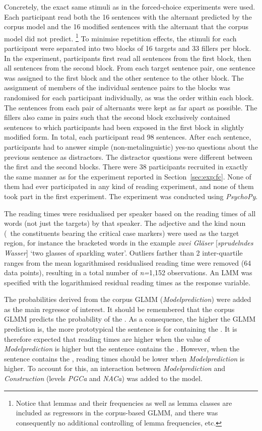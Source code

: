 Concretely, the exact same stimuli as in the forced-choice experiments were used.
Each participant read both the 16 sentences with the alternant predicted by the corpus model and the 16 modified sentences with the alternant that the corpus model did not predict.%
\footnote{Notice that lemmas and their frequencies as well as lemma classes are included as regressors in the corpus-based GLMM, and there was consequently no additional controlling of lemma frequencies, etc.}
To minimise repetition effects, the stimuli for each participant were separated into two blocks of 16 targets and 33 fillers per block.
In the experiment, participants first read all sentences from the first block, then all sentences from the second block.
From each target sentence pair, one sentence was assigned to the first block and the other sentence to the other block.
The assignment of members of the individual sentence pairs to the blocks was randomised for each participant individually, as was the order within each block.
The sentences from each pair of alternants were kept as far apart as possible.
The fillers also came in pairs such that the second block exclusively contained sentences to which participants had been exposed in the first block in slightly modified form.
In total, each participant read 98 sentences.
After each sentence, participants had to answer simple (non-metalinguistic) yes-no questions about the previous sentence as distractors.
The distractor questions were different between the first and the second blocks.
There were 38 participants recruited in exactly the same manner as for the experiment reported in Section~\ref{sec:exp:fc}.
None of them had ever participated in any kind of reading experiment, and none of them took part in the first experiment.
The experiment was conducted using \textit{PsychoPy}.

The reading times were residualised per speaker based on the reading times of all words (not just the targets) by that speaker.
The adjective and the kind noun (\ie\ the constituents bearing the critical case markers) were used as the target region, for instance the bracketed words in the example \textit{zwei Gläser} [\textit{spru\-deln\-des Wasser}] `two glasses of sparkling water'.
Outliers farther than 2 inter-quartile ranges from the mean logarithmised residualised reading time were removed (64 data points), resulting in a total number of \textit{n=}1,152 observations.
An LMM was specified with the logarithmised residual reading times as the response variable.

The probabilities derived from the corpus GLMM (\textit{Modelprediction}) were added as the main regressor of interest.
It should be remembered that the corpus GLMM predicts the probability of the \PGCa.
As a consequence, the higher the GLMM prediction is, the more prototypical the sentence is for containing the \PGCa.
It is therefore expected that reading times are higher when the value of \textit{Modelprediction} is higher but the sentence contains the \NACa.
However, when the sentence contains the \PGCa, reading times should be lower when \textit{Modelprediction} is higher.
To account for this, an interaction between \textit{Modelprediction} and \textit{Construction} (levels \textit{PGCa} and \textit{NACa}) was added to the model.

